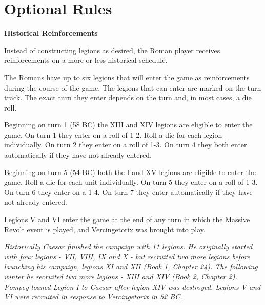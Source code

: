\section{Optional Rules}
\par

\textbf{Historical Reinforcements}

Instead of constructing legions as desired, the Roman player receives reinforcements on a more or less historical schedule.

The Romans have up to six legions that will enter the game as reinforcements during the course of the game. The legions that can enter are marked on the turn track. The exact turn they enter depends on the turn and, in most cases, a die roll.

Beginning on turn 1 (58 BC) the XIII and XIV legions are eligible to enter the game. On turn 1 they enter on a roll of 1-2. Roll a die for each legion individually. On turn 2 they enter on a roll of 1-3. On turn 4 they both enter automatically if they have not already entered.

Beginning on turn 5 (54 BC) both the I and XV legions are eligible to enter the game. Roll a die for each unit individually. On turn 5 they enter on a roll of 1-3. On turn 6 they enter on a 1-4. On turn 7 they enter automatically if they have not already entered.

Legions V and VI enter the game at the end of any turn in which the Massive Revolt event is played, and Vercingetorix was brought into play.

\textit{Historically Caesar finished the campaign with 11 legions. He originally started with four legions - VII, VIII, IX and X - but recruited two more legions before launching his campaign, legions XI and XII (Book 1, Chapter 24). The following winter he recruited two more legions - XIII and XIV (Book 2, Chapter 2). Pompey loaned Legion I to Caesar after legion XIV was destroyed. Legions V and VI were recruited in response to Vercingetorix in 52 BC.}